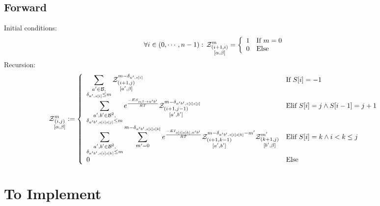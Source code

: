 \documentclass[11pt]{article} %
\begin{document}
\subsection{Forward}
Initial conditions:
$$
	\forall i \in (0,\cdots,n-1):\, \Z{i+1,i}{m}{\alpha,\beta}=\left\{
	\begin{array}{ll}
		1 &\text{If } m = 0\\
		0 &\text{Else }
	\end{array}\right.
$$
Recursion:
$$
	\Z{i,j}{m}{\alpha,\beta}:=\left\{
  \begin{array}{ll}
  		\displaystyle
      \sum_{\substack{a'\in \B,\\ \Kron_{a',s[i]}\le m}}  
      \Z{i+1,j}{m-\Kron_{a',s[i]}}{a',\beta} & \text{If }S{[i]}=-1\\
      \displaystyle
      \sum_{\substack{a',b'\in \B^2,\\ \Kron_{a'b',s[i]s[j]}\le m}}  
			 e^{\frac{-ES_{\alpha \beta \to a' b'}}{RT}}
			 \Z{i+1,j-1}{m-\Kron_{a'b',s[i]s[j]}}{a',b'}&
			 \text{Elif }S{[i]}=j \land S{[i-1]}=j+1\\
			 \displaystyle
      \sum_{\substack{a',b'\in \B^2,\\ \Kron_{a'b',s[i]s[k]}\le m}}
      \sum_{m'=0}^{m-\Kron_{a'b',s[i]s[k]}}
   		 e^{\frac{-EI_{s[i]s[k],a'b'}}{RT}}
      \Z{i+1,k-1}{m-\Kron_{a'b',s[i]s[k]}-m'}{a',b'}
      \Z{k+1,j}{m'}{b',\beta} & \text{Elif }S[i]=k \land i < k \leq j\\
      0 &\text{Else}
	\end{array}\right.
$$

\section{To Implement}
\end{document}
